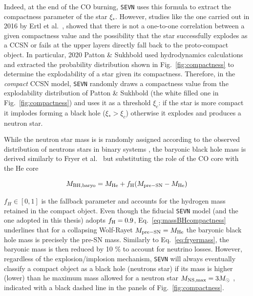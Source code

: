 \documentclass[a4paper,titlepage]{book}     	%
\newcommand{\sun}{\ensuremath{_\odot}}
\newcommand{\msun}{\ensuremath{M\sun}}
\begin{document}
Indeed, at the end of the CO burning, \texttt{SEVN} uses this formula to extract the compactness parameter of the star $\xi_*$. However, studies like the one carried out in 2016 by Ertl et al.\ \cite{Ertl2016}, showed that there is not a one-to-one correlation between a given compactness value and the possibility that the star successfully explodes as a CCSN or fails at the upper layers directly fall back to the proto-compact object. In particular, 2020 Patton \& Sukhbold \cite{COcollapse} used hydrodynamics calculations and extracted the probability distribution shown in Fig.\ \ref{fig:compactness} to determine the explodability of a star given its compactness. Therefore, in the \emph{compact} CCSN model, \texttt{SEVN} randomly draws a compactness value from the explodability distribution of Patton \& Sukhbold (the white filled one in Fig.\ \ref{fig:compactness}) and uses it as a threshold $\xi_c$: if the star is more compact it implodes forming a black hole ($\xi_* > \xi_c$) otherwise it explodes and produces a neutron star.

While the neutron star mass is is randomly assigned according to the observed distribution of neutrons stars in binary systems \cite{mapelli2020_compactness}, the baryonic black hole mass is derived similarly to Fryer et al.\ \cite{Fryer2012} but substituting the role of the CO core with the He core

\begin{equation}\label{eq:massBHcompactness}
    M_{\rm BH, baryo} = M_{\rm He} + f_{\rm H} (M_{\rm pre-SN}-M_{\rm He})
\end{equation}

$f_H \in [0,1]$ is the fallback parameter and accounts for the hydrogen mass retained in the compact object. Even though the fiducial \texttt{SEVN} model (and the one adopted in this thesis) adopts $f_{\rm H} = 0.9$, Eq.\ \ref{eq:massBHcompactness} underlines that for a collapsing Wolf-Rayet $M_{\rm pre-SN}=M_{\rm He}$ the baryonic black hole mass is precisely the pre-SN mass. Similarly to Eq.\ \ref{eq:fryermass}, the baryonic mass is then reduced by 10 \% to account for neutrino losses. However, regardless of the explosion/implosion mechanism, \texttt{SEVN} will always eventually classify a compact object as a black hole (neutrons star) if its mass is higher (lower) than he maximum mass allowed for a neutron star $M_{\rm NS,max} = 3\msun$ \cite{NSreview,spera2019_mergingBBH}, indicated with a black dashed line in the panels of Fig.\ \ref{fig:compactness}. \\
\end{document}
